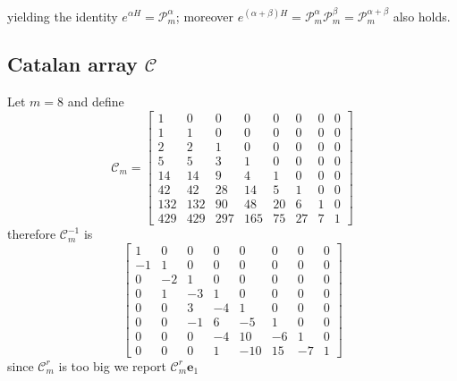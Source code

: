 yielding the identity $e^{\alpha H} = \mathcal{P}_{m}^{\alpha}$;
moreover $e^{(\alpha+\beta) H} = \mathcal{P}_{m}^{\alpha}\mathcal{P}_{m}^{\beta} = \mathcal{P}_{m}^{\alpha+\beta}$ also holds.


\subsection{Catalan array $\mathcal{C}$}

Let $m=8$ and define
\begin{displaymath}
\mathcal{C}_{m}=\left[\begin{matrix}1 & 0 & 0 & 0 & 0 & 0 & 0 & 0\\1 & 1 & 0 & 0 & 0 & 0 & 0 & 0\\2 & 2 & 1 & 0 & 0 & 0 & 0 & 0\\5 & 5 & 3 & 1 & 0 & 0 & 0 & 0\\14 & 14 & 9 & 4 & 1 & 0 & 0 & 0\\42 & 42 & 28 & 14 & 5 & 1 & 0 & 0\\132 & 132 & 90 & 48 & 20 & 6 & 1 & 0\\429 & 429 & 297 & 165 & 75 & 27 & 7 & 1\end{matrix}\right]
\end{displaymath}
therefore $\mathcal{C}_{m}^{-1}$ is
\begin{displaymath}
\left[\begin{matrix}1 & 0 & 0 & 0 & 0 & 0 & 0 & 0\\-1 & 1 & 0 & 0 & 0 & 0 & 0 & 0\\0 & -2 & 1 & 0 & 0 & 0 & 0 & 0\\0 & 1 & -3 & 1 & 0 & 0 & 0 & 0\\0 & 0 & 3 & -4 & 1 & 0 & 0 & 0\\0 & 0 & -1 & 6 & -5 & 1 & 0 & 0\\0 & 0 & 0 & -4 & 10 & -6 & 1 & 0\\0 & 0 & 0 & 1 & -10 & 15 & -7 & 1\end{matrix}\right]
\end{displaymath}
since $\mathcal{C}_{m}^{r}$ is too big we report $\mathcal{C}_{m}^{r}\textbf{e}_{1}$ 
